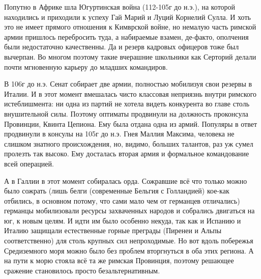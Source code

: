 Попутно в Африке шла Югуртинская война (112-105г до н.э.), на которой находились и приходили к успеху Гай Марий и Луций Корнелий Сулла. И хоть это не имеет прямого отношения к Кимврской войне, но немалую часть римской армии пришлось перебросить туда, а набираемые взамен, де-факто, ополчения были недостаточно качественны. Да и резерв кадровых офицеров тоже был вычерпан. Во многом поэтому такие вчерашние школьники как Серторий делали почти мгновенную карьеру до младших командиров.


В 106г до н.э. Сенат собирает две армии, полностью мобилизуя свои резервы в Италии. И в этот момент вмешалась чисто классовая неприязнь внутри римского истеблишмента: ни одна из партий не хотела видеть конкурента во главе столь внушительной силы. Поэтому оптиматы продвинули на должность проконсула Провинции, Квинта Цепиона. Ему была отдана одна из армий. Популяры в ответ продвинули в консулы на 105г до н.э. Гнея Маллия Максима, человека не слишком знатного происхождения, но, видимо, больших талантов, раз уж сумел пролезть так высоко. Ему досталась вторая армия и формальное командование всей операцией.


А в Галлии в этот момент собиралась орда. Сожравшие всё что только можно было сожрать (лишь белги (современные Бельгия с Голландией) кое-как отбились, в основном потому, что сами мало чем от германцев отличались) германцы мобилизовали ресурсы захваченных народов и собрались двигаться на юг, к новым целям. И идти им было особенно некуда, так как и Испанию и Италию защищали естественные горные преграды (Пиренеи и Альпы соответственно) для столь крупных сил непроходимые. Но вот вдоль побережья Средиземного моря можно было без проблем вторгнуться в оба этих региона. А на пути к морю стояла всё та же римская Провинция, поэтому решающее сражение становилось просто безальтернативным.



